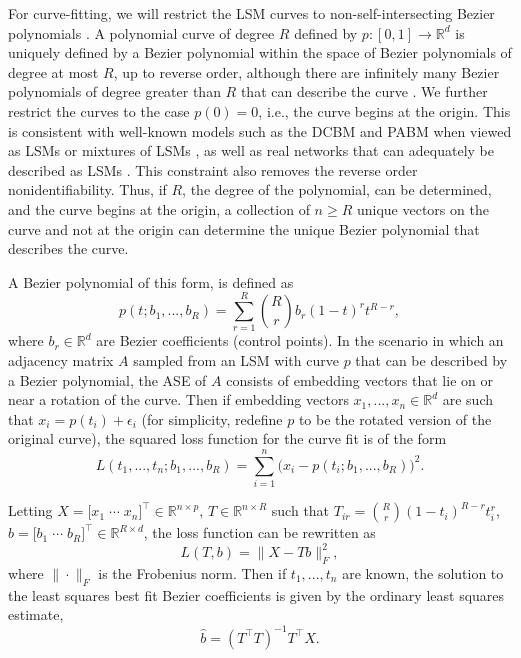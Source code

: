 \documentclass[12pt]{article}
\begin{document}
For curve-fitting, we will restrict the LSM curves to
non-self-intersecting Bezier polynomials \citep{10.5555/320367}. A
polynomial curve of degree \(R\) defined by
\(p : [0, 1] \to \mathbb{R}^d\) is uniquely defined by a Bezier
polynomial within the space of Bezier polynomials of degree at most
\(R\), up to reverse order, although there are infinitely many Bezier
polynomials of degree greater than \(R\) that can describe the curve
\citep{SANCHEZREYES2022102118}. We further restrict the curves to the
case \(p(0) = 0\), i.e., the curve begins at the origin. This is
consistent with well-known models such as the DCBM and PABM when viewed
as LSMs or mixtures of LSMs
\citep{Koo_2022, rubindelanchy2017statistical}, as well as real networks
that can adequately be described as LSMs \citep{athreya2020estimation}.
This constraint also removes the reverse order nonidentifiability. Thus,
if \(R\), the degree of the polynomial, can be determined, and the curve
begins at the origin, a collection of \(n \geq R\) unique vectors on the
curve and not at the origin can determine the unique Bezier polynomial
that describes the curve.

A Bezier polynomial of this form, is defined as \begin{equation}
\label{eq:bezier}
p(t; b_1, ..., b_R) = \sum_{r=1}^R \binom{R}{r} b_r (1-t)^r t^{R-r},
\end{equation} where \(b_r \in \mathbb{R}^d\) are Bezier coefficients
(control points). In the scenario in which an adjacency matrix \(A\)
sampled from an LSM with curve \(p\) that can be described by a Bezier
polynomial, the ASE of \(A\) consists of embedding vectors that lie on
or near a rotation of the curve. Then if embedding vectors
\(x_1, ..., x_n \in \mathbb{R}^d\) are such that
\(x_i = p(t_i) + \epsilon_i\) (for simplicity, redefine \(p\) to be the
rotated version of the original curve), the squared loss function for
the curve fit is of the form \begin{equation}
\label{eq:bezier-loss-full}
L(t_1, ..., t_n; b_1, ..., b_R) = \sum_{i=1}^n \big( x_i - p(t_i; b_1, ..., b_R) \big)^2.
\end{equation}

Letting
\(X = \bigl[ x_1 \; \cdots \; x_n \bigr]^\top \in \mathbb{R}^{n \times p}\),
\(T \in \mathbb{R}^{n \times R}\) such that
\(T_{ir} = \binom{R}{r} (1-t_i)^{R-r} t_i^r\),
\(b = \bigl[b_1 \; \cdots \; b_R\bigr]^\top \in \mathbb{R}^{R \times d}\),
the loss function can be rewritten as \begin{equation}
\label{eq:bezier-loss}
L(T, b) = \|X - T b\|_F^2,
\end{equation} where \(\|\cdot\|_F\) is the Frobenius norm. Then if
\(t_1, ..., t_n\) are known, the solution to the least squares best fit
Bezier coefficients is given by the ordinary least squares estimate,
\begin{equation}
\label{eq:bezier-ols}
\hat{b} = (T^\top T)^{-1} T^\top X.
\end{equation}
\end{document}
